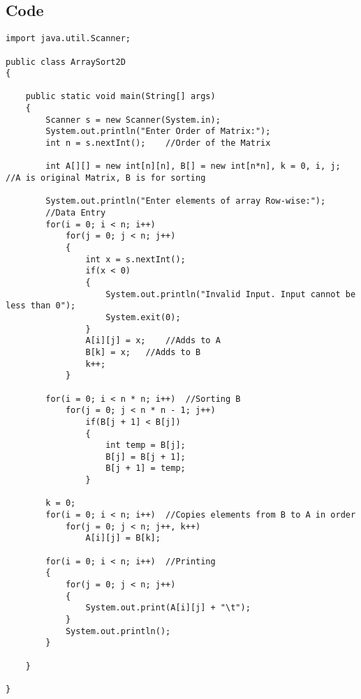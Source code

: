\documentclass[ProgramminAssignment.tex]{subfiles}
\begin{document}
\subsection{Code}
\begin{lstlisting}
import java.util.Scanner;

public class ArraySort2D
{

	public static void main(String[] args)
	{
		Scanner s = new Scanner(System.in);
		System.out.println("Enter Order of Matrix:");
		int n = s.nextInt();	//Order of the Matrix
		
		int A[][] = new int[n][n], B[] = new int[n*n], k = 0, i, j;	//A is original Matrix, B is for sorting
		
		System.out.println("Enter elements of array Row-wise:");
		//Data Entry
		for(i = 0; i < n; i++)
			for(j = 0; j < n; j++)
			{
				int x = s.nextInt();
				if(x < 0)
				{
					System.out.println("Invalid Input. Input cannot be less than 0");
					System.exit(0);
				}
				A[i][j] = x;	//Adds to A
				B[k] = x;	//Adds to B
				k++;
			}
		
		for(i = 0; i < n * n; i++)	//Sorting B
			for(j = 0; j < n * n - 1; j++)
				if(B[j + 1] < B[j])
				{
					int temp = B[j];
					B[j] = B[j + 1];
					B[j + 1] = temp;
				}

		k = 0;		
		for(i = 0; i < n; i++)	//Copies elements from B to A in order
			for(j = 0; j < n; j++, k++)
				A[i][j] = B[k];
		
		for(i = 0; i < n; i++)	//Printing
		{
			for(j = 0; j < n; j++)
			{
				System.out.print(A[i][j] + "\t");
			}
			System.out.println();
		}
		
	}

}
\end{lstlisting}
\end{document}

